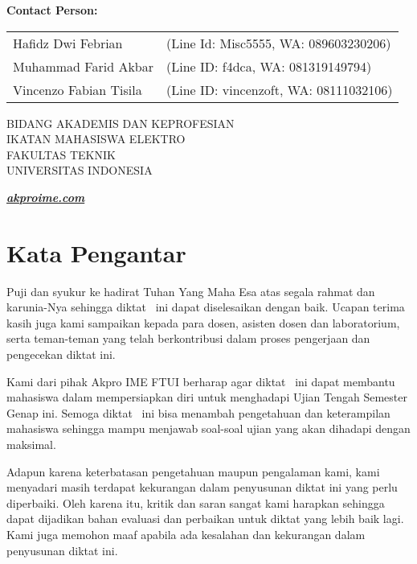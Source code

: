 \begin{flushleft}
    \textbf{Contact Person:} \\[0.5\baselineskip]
    \begin{tabular}{@{}l@{\ }l@{}}
        Hafidz Dwi Febrian     &(Line Id: Misc5555, WA: 089603230206) \\
        Muhammad Farid Akbar   &(Line ID: f4dca, WA: 081319149794) \\
        Vincenzo Fabian Tisila &(Line ID: vincenzoft, WA: 08111032106)
    \end{tabular}
\end{flushleft}
\vspace{0.25\baselineskip}
\begin{center}
    BIDANG AKADEMIS DAN KEPROFESIAN \\
    IKATAN MAHASISWA ELEKTRO \\
    FAKULTAS TEKNIK \\
    UNIVERSITAS INDONESIA
\end{center}
\vspace{-1\baselineskip}
\begin{flushright}
    \textbf{\textit{\href{https://akproime.com}{akproime.com}}}
\end{flushright}

\newpage


\section{Kata Pengantar}
Puji dan syukur ke hadirat Tuhan Yang Maha Esa atas segala rahmat dan karunia-Nya sehingga diktat \MyTitle\ ini dapat diselesaikan dengan baik. Ucapan terima kasih juga kami sampaikan kepada para dosen, asisten dosen dan laboratorium, serta teman-teman yang telah berkontribusi dalam proses pengerjaan dan pengecekan diktat ini.
\vspace{12pt}

Kami dari pihak Akpro IME FTUI berharap agar diktat \MyTitle\ ini dapat membantu mahasiswa dalam mempersiapkan diri untuk menghadapi Ujian Tengah Semester Genap ini. Semoga diktat \MyTitle\ ini bisa menambah pengetahuan dan keterampilan mahasiswa sehingga mampu menjawab soal-soal ujian yang akan dihadapi dengan maksimal.
\vspace{12pt}

Adapun karena keterbatasan pengetahuan maupun pengalaman kami, kami menyadari masih terdapat kekurangan dalam penyusunan diktat ini yang perlu diperbaiki. Oleh karena itu, kritik dan saran sangat kami harapkan sehingga dapat dijadikan bahan evaluasi dan perbaikan untuk diktat yang lebih baik lagi. Kami juga memohon maaf apabila ada kesalahan dan kekurangan dalam penyusunan diktat ini.
\vspace{12pt}

